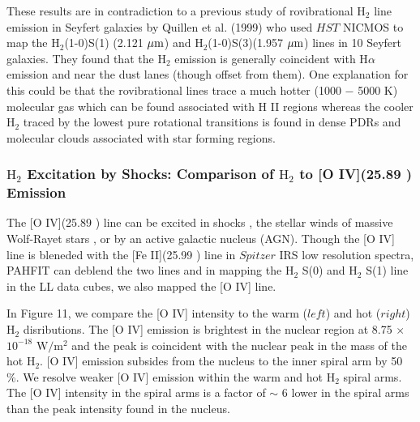 \documentclass[manuscript]{aastex}
\begin{document}
These results are in contradiction to a previous study of rovibrational $\mathrm{H_2}$ line emission in Seyfert galaxies by Quillen et al. (1999) who used $HST$ NICMOS to map the $\mathrm{H_2}$(1-0)S(1) (2.121 $\mbox{$\mu$m}$) and $\mathrm{H_2}$(1-0)S(3)(1.957 $\mbox{$\mu$m}$) lines in 10 Seyfert galaxies.  They found that the $\mathrm{H_2}$ emission is generally coincident with H$\alpha$ emission and near the dust lanes (though offset from them).  One explanation for this could be that the rovibrational lines trace a much hotter (1000 $-$ 5000 K) molecular gas which can be found associated with H II regions whereas the cooler $\mathrm{H_2}$ traced by the lowest pure rotational transitions is found in dense PDRs and molecular clouds associated with star forming regions.

\subsubsection{$\mathrm{H_2}$ Excitation by Shocks: Comparison of $\mathrm{H_2}$ to [O IV](25.89 \micron) Emission}

The [O IV](25.89 \micron) line can be excited in shocks \citep{ss99}, the stellar winds of massive Wolf-Rayet stars \citep{lutz98}, or by an active galactic nucleus (AGN)\citep{smi04}.  Though the [O IV] line is bleneded with the [Fe II](25.99 \micron) line in $Spitzer$ IRS low resolution spectra, PAHFIT can deblend the two lines and in mapping the $\mathrm{H_2}$ S(0) and $\mathrm{H_2}$ S(1) line in the LL data cubes, we also mapped the [O IV] line.

In Figure 11, we compare the [O IV] intensity to the warm ($left$) and hot ($right$) $\mathrm{H_2}$ disributions.  The [O IV] emission is brightest in the nuclear region at 8.75 $\times$ $\mathrm{10^{-18}}$ $\mathrm{W/m^2}$ and the peak is coincident with the nuclear peak in the mass of the hot $\mathrm{H_2}$.  [O IV] emission subsides from the nucleus to the inner spiral arm by 50 \%.  We resolve weaker [O IV] emission within the warm and hot $\mathrm{H_2}$ spiral arms.  The  [O IV] intensity in the spiral arms is a factor of $\sim$ 6 lower in the spiral arms than the peak intensity found in the nucleus.
\end{document}

